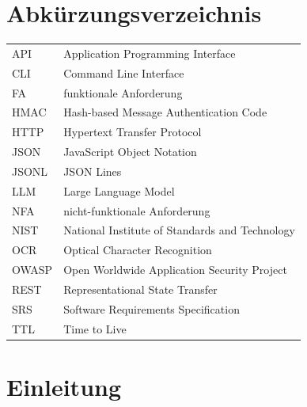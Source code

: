 \documentclass[12pt,a4paper,oneside]{scrreprt}
\begin{document}
\clearpage
{\tableofcontents}
\clearpage
{}
{\listoffigures}
\clearpage
{}
{\listoftables}
\clearpage
\chapter*{Abkürzungsverzeichnis}
\small
\noindent
\begin{tabularx}{\textwidth}{@{}p{}X@{}}
API & Application Programming Interface \\
CLI & Command Line Interface \\
FA & funktionale Anforderung \\
HMAC & Hash-based Message Authentication Code \\
HTTP & Hypertext Transfer Protocol \\
JSON & JavaScript Object Notation \\
JSONL & JSON Lines \\
LLM & Large Language Model \\
NFA & nicht-funktionale Anforderung \\
NIST & National Institute of Standards and Technology \\
OCR & Optical Character Recognition \\
OWASP & Open Worldwide Application Security Project \\
REST & Representational State Transfer \\
SRS & Software Requirements Specification \\
TTL & Time to Live \\
\end{tabularx}
\normalsize
\clearpage
\restoregeometry
\pagestyle{scrheadings}
\setcounter{page}{1}



\iffalse
\chapter{Einleitung}
\end{document}
